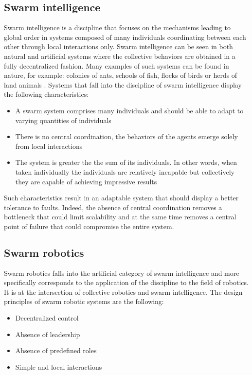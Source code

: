 \subsection{Swarm intelligence}
Swarm intelligence is a discipline that focuses on the mechanisms leading to global order in systems composed of many individuals coordinating between each other through local interactions only. Swarm intelligence can be seen in both natural and artificial systems where the collective behaviors are obtained in a fully decentralized fashion. Many examples of such systems can be found in nature, for example: colonies of ants, schools of fish, flocks of birds or herds of land animals \cite{Dorigo:2007}. Systems that fall into the discipline of swarm intelligence display the following characteristics: 

\begin{itemize}
    \item A swarm system comprises many individuals and should be able to adapt to varying quantities of individuals
    \item There is no central coordination, the behaviors of the agents emerge solely from local interactions
    \item The system is greater the the sum of its individuals. In other words, when taken individually the individuals are relatively incapable but collectively they are capable of achieving impressive results   
\end{itemize}

Such characteristics result in an adaptable system that should display a better tolerance to faults. Indeed, the absence of central coordination removes a bottleneck that could limit scalability and at the same time removes a central point of failure that could compromise the entire system.

\subsection{Swarm robotics}
\label{sec:designprinciples}
Swarm robotics falls into the artificial category of swarm intelligence and more specifically corresponds to the application of the discipline to the field of robotics. It is at the intersection of collective robotics and swarm intelligence. The design principles of swarm robotic systems are the following: 

\begin{itemize}
    \item Decentralized control
    \item Absence of leadership
    \item Absence of predefined roles
    \item Simple and local interactions
\end{itemize}


